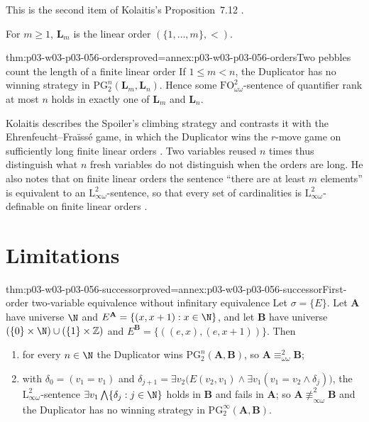This is the second item of Kolaitis's Proposition~7.12
\cite[Prop.~7.12, p.~60]{Kolaitis2003ExpressivePowerNotes}.

For \(m\geq1\), \(\mathbf L_m\) is the linear order \((\{1,\ldots,m\},<)\).

\begin{hbtheorem}{thm:p03-w03-p03-056-orders}{proved=annex:p03-w03-p03-056-orders}{Two pebbles count the length of a finite linear order}
If \(1\leq m<n\), the Duplicator has no winning strategy in
\(\mathrm{PG}^n_2(\mathbf L_m,\mathbf L_n)\). Hence some
\(\mathrm{FO}^2_{\omega\omega}\)-sentence of quantifier rank at most \(n\)
holds in exactly one of \(\mathbf L_m\) and \(\mathbf L_n\).
\end{hbtheorem}

Kolaitis describes the Spoiler's climbing strategy and contrasts it with the
Ehrenfeucht--Fra\"iss\'e game, in which the Duplicator wins the \(r\)-move
game on sufficiently long finite linear orders
\cite[Ex.~7.6, p.~56]{Kolaitis2003ExpressivePowerNotes}. Two variables
reused \(n\) times thus distinguish what \(n\) fresh variables do not
distinguish when the orders are long. He also notes that on finite linear
orders the sentence ``there are at least \(m\) elements'' is equivalent to
an \(\mathrm{L}^2_{\infty\omega}\)-sentence, so that every set of
cardinalities is \(\mathrm{L}^2_{\infty\omega}\)-definable on finite linear
orders \cite[p.~53]{Kolaitis2003ExpressivePowerNotes}.

\section{Limitations}
\label{sec:p03-w03-p03-056-limits}

\begin{hbtheorem}{thm:p03-w03-p03-056-successor}{proved=annex:p03-w03-p03-056-successor}{First-order two-variable equivalence without infinitary equivalence}
Let \(\sigma=\{E\}\). Let \(\mathbf A\) have universe \(\N\) and
\(E^{\mathbf A}=\{(x,x+1):x\in\N\}\), and let \(\mathbf B\) have universe
\((\{0\}\times\N)\cup(\{1\}\times\mathbb Z)\) and
\(E^{\mathbf B}=\{((e,x),(e,x+1))\}\). Then
\begin{enumerate}
\item for every \(n\in\N\) the Duplicator wins
      \(\mathrm{PG}^n_2(\mathbf A,\mathbf B)\), so
      \(\mathbf A\equiv^2_{\omega\omega}\mathbf B\);
\item with \(\delta_0=(v_1=v_1)\) and
      \(\delta_{j+1}=\exists v_2\bigl(E(v_2,v_1)\land
      \exists v_1(v_1=v_2\land\delta_j)\bigr)\), the
      \(\mathrm{L}^2_{\infty\omega}\)-sentence
      \(\exists v_1\bigwedge\{\delta_j:j\in\N\}\) holds in \(\mathbf B\) and
      fails in \(\mathbf A\); so
      \(\mathbf A\not\equiv^2_{\infty\omega}\mathbf B\) and the Duplicator
      has no winning strategy in \(\mathrm{PG}^\infty_2(\mathbf A,\mathbf B)\).
\end{enumerate}
\end{hbtheorem}

